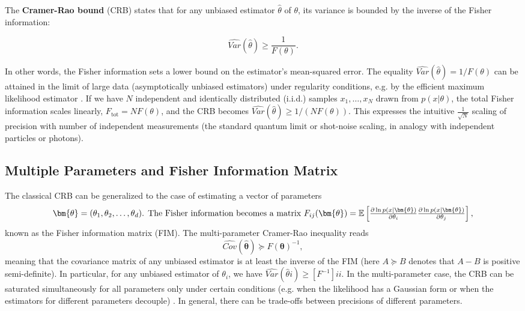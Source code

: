The \textbf{Cramer-Rao bound} (CRB) states that for any unbiased
estimator $\hat{\theta}$ of $\theta$, its variance is bounded by the
inverse of the Fisher information:

\begin{equation}
\widehat{Var}(\hat{\theta})\ge\frac{1}{F(\theta)}.
\label{eq:CRB-classical}
\end{equation}

In other words, the Fisher information sets a lower bound on the
estimator’s mean-squared error. The equality $\widehat{Var}(\hat{\theta}) =
1/F(\theta)$ can be attained in the limit of large data
(asymptotically unbiased estimators) under regularity conditions,
e.g. by the efficient maximum likelihood estimator \cite{Kay1993}. If
we have $N$ independent and identically distributed (i.i.d.) samples
$x_1,\dots,x_N$ drawn from $p(x|\theta)$, the total Fisher information
scales linearly, $F_{\text{tot}} = N F(\theta)$, and the CRB becomes
$\widehat{Var}(\hat{\theta}) \ge 1/(N F(\theta))$. This expresses the intuitive
$\frac{1}{\sqrt{N}}$ scaling of precision with number of independent
measurements (the standard quantum limit or shot-noise scaling, in
analogy with independent particles or photons).



\subsection{Multiple Parameters and Fisher Information Matrix}



The classical CRB can be generalized to the case of estimating a
vector of parameters
\[
\bm{\theta} =
(\theta_1,\theta_2,\dots,\theta_d)$. The Fisher information becomes a
matrix $F_{ij}(\bm{\theta}) = \mathbb{E}\left[ \frac{\partial \ln
    p(x|\bm{\theta})}{\partial \theta_i}\frac{\partial \ln
    p(x|\bm{\theta})}{\partial \theta_j} \right],
\]
known as the Fisher information matrix (FIM). The multi-parameter
Cramer-Rao inequality reads
\begin{equation}
\widehat{Cov}(\hat{\bm{\theta}}) \succeq F(\bm{\theta})^{-1},
\end{equation}
meaning that the covariance matrix of any unbiased estimator is at
least the inverse of the FIM (here $A \succeq B$ denotes that $A - B$
is positive semi-definite). In particular, for any unbiased estimator
of $\theta_i$, we have $\widehat{Var}(\hat{\theta}i) \ge [F^{-1}]{ii}$. In the
multi-parameter case, the CRB can be saturated simultaneously for all
parameters only under certain conditions (e.g. when the likelihood has
a Gaussian form or when the estimators for different parameters
decouple) \cite{Kay1993}. In general, there can be trade-offs between
precisions of different parameters.



